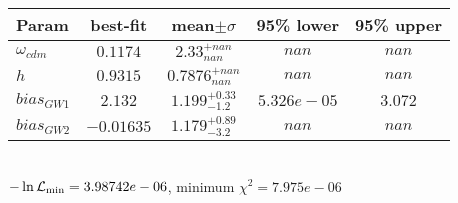 \begin{tabular}{|l|c|c|c|c|} 
 \hline 
Param & best-fit & mean$\pm\sigma$ & 95\% lower & 95\% upper \\ \hline 
$\omega_{cdm }$ &$0.1174$ & $2.33_{nan}^{+nan}$ & $nan$ & $nan$ \\ 
$h$ &$0.9315$ & $0.7876_{nan}^{+nan}$ & $nan$ & $nan$ \\ 
$bias_{GW 1 }$ &$2.132$ & $1.199_{-1.2}^{+0.33}$ & $5.326e-05$ & $3.072$ \\ 
$bias_{GW 2 }$ &$-0.01635$ & $1.179_{-3.2}^{+0.89}$ & $nan$ & $nan$ \\ 
\hline 
 \end{tabular} \\ 
$-\ln{\cal L}_\mathrm{min} =3.98742e-06$, minimum $\chi^2=7.975e-06$ \\ 

